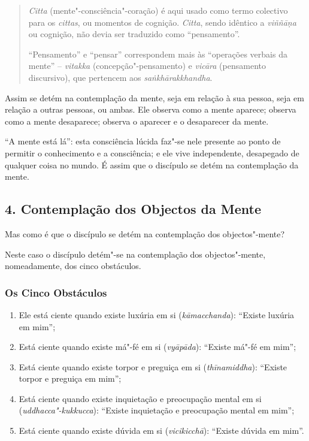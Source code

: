 
\begin{quote}
  \emph{Citta} (mente"-consciência"-coração) é aqui usado como termo colectivo
  para os \emph{cittas}, ou momentos de cognição. \emph{Citta}, sendo idêntico a
  \emph{viññā\d{n}a} ou cognição, não devia ser traduzido como “pensamento”.

  “Pensamento” e “pensar” correspondem mais às “operações verbais da
  mente” -- \emph{vitakka} (concepção"-pensamento) e \emph{vicāra} (pensamento
  discursivo), que pertencem aos \emph{sa\.{n}khārakkhandha}.
\end{quote}

Assim se detém na contemplação da mente, seja em relação à sua pessoa, seja em
relação a outras pessoas, ou ambas. Ele observa como a mente aparece; observa
como a mente desaparece; observa o aparecer e o desaparecer da mente.

“A mente está lá”: esta consciência lúcida faz"-se nele presente ao ponto de
permitir o conhecimento e a consciência; e ele vive independente, desapegado de
qualquer coisa no mundo. É assim que o discípulo se detém na contemplação da
mente.

\subsection{4. Contemplação dos Objectos da Mente}


Mas como é que o discípulo se detém na contemplação dos objectos"-mente?

Neste caso o discípulo detém"-se na contemplação dos objectos"-mente,
nomeadamente, dos cinco obstáculos.

\subsubsection{Os Cinco Obstáculos}


\begin{enumerate}
  \item Ele está ciente quando existe luxúria em si (\emph{kāmacchanda}):
        “Existe luxúria em mim”;

  \item Está ciente quando existe má"-fé em si (\emph{vyāpāda}): “Existe má"-fé
         em mim”;

  \item Está ciente quando existe torpor e preguiça em si (\emph{thīnamiddha}):
        “Existe torpor e preguiça em mim”;

  \item Está ciente quando existe inquietação e preocupação mental em si
        (\emph{uddhacca"-kukkucca}): “Existe inquietação e preocupação
        mental em mim”;

  \item Está ciente quando existe dúvida em si (\emph{vicikicchā}): “Existe dúvida em
        mim”.
\end{enumerate}

